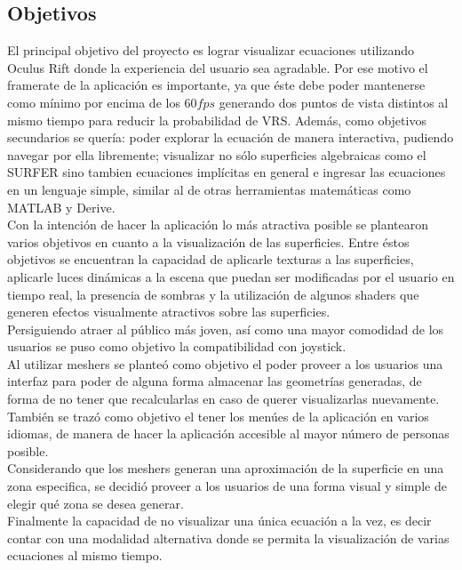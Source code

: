 \documentclass[12pt]{article}
\begin{document}
\subsection{Objetivos}
El principal objetivo del proyecto es lograr visualizar ecuaciones utilizando Oculus Rift donde  la experiencia del usuario sea agradable. Por ese motivo el framerate de la aplicación es importante, ya que éste debe poder mantenerse como mínimo por encima de los $60 fps$ generando dos puntos de vista distintos al mismo tiempo para reducir la probabilidad de VRS. Además, como objetivos secundarios se quería: poder explorar la ecuación de manera interactiva, pudiendo navegar por ella libremente; visualizar no sólo superficies algebraicas como el SURFER sino tambien ecuaciones implícitas en general e ingresar las ecuaciones en un lenguaje simple, similar al de otras herramientas matemáticas como MATLAB y Derive.
\\Con la intención de hacer la aplicación lo más atractiva posible se plantearon varios objetivos en cuanto a la visualización de las superficies. Entre éstos objetivos se encuentran la capacidad de aplicarle texturas a las superficies, aplicarle luces dinámicas a la escena que puedan ser modificadas por el usuario en tiempo real, la presencia de sombras y la utilización de algunos shaders que generen efectos visualmente atractivos sobre las superficies.
\\Persiguiendo atraer al público más joven, así como una mayor comodidad de los usuarios se puso como objetivo la compatibilidad con joystick.
\\Al utilizar meshers se planteó como objetivo el poder proveer a los usuarios una interfaz para poder de alguna forma almacenar las geometrías generadas, de forma de no tener que recalcularlas en caso de querer visualizarlas nuevamente.
\\También se trazó como objetivo el tener los menúes de la aplicación en varios idiomas, de manera de hacer la aplicación accesible al mayor número de personas posible.
\\Considerando que los meshers generan una aproximación de la superficie en una zona especifica, se decidió proveer a los usuarios de una forma visual y simple de elegir qué zona se desea generar.
\\Finalmente la capacidad de no visualizar una única ecuación a la vez, es decir contar con una modalidad alternativa donde se permita la visualización de varias ecuaciones al mismo tiempo.
\end{document}

